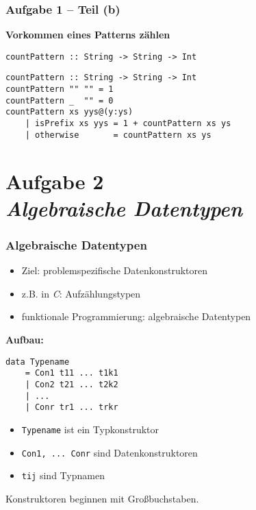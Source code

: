 \documentclass{beamer}
\begin{document}
\begin{frame}[t, fragile] \frametitle{Aufgabe 1 -- Teil (b)}
	\textbf{Vorkommen eines Patterns zählen}
	
	\texttt{countPattern :: String -> String -> Int}
	
	\pause\bigskip

	\begin{lstlisting}[style=bg]
countPattern :: String -> String -> Int
countPattern "" "" = 1
countPattern _  "" = 0
countPattern xs yys@(y:ys)
	| isPrefix xs yys = 1 + countPattern xs ys
	| otherwise       = countPattern xs ys
	\end{lstlisting}
\end{frame}


\section{Aufgabe 2 \\ \textit{\normalsize Algebraische Datentypen}}

\begin{frame}[fragile] \frametitle{Algebraische Datentypen}
	\footnotesize
	\begin{itemize}
		\item Ziel: problemspezifische Datenkonstruktoren
		\item z.B. in \textit{C}: Aufzählungstypen
		\item funktionale Programmierung: algebraische Datentypen
	\end{itemize}

	\textbf{Aufbau:}
	\begin{lstlisting}[style=bg]
data Typename 
	= Con1 t11 ... t1k1
	| Con2 t21 ... t2k2
	| ...
	| Conr tr1 ... trkr
	\end{lstlisting}
	\begin{itemize}
		\item \texttt{Typename} ist ein Typkonstruktor
		\item \texttt{Con1, ... Conr} sind Datenkonstruktoren
		\item \texttt{tij} sind Typnamen
	\end{itemize}
	Konstruktoren beginnen mit Großbuchstaben.
\end{frame}
\end{document}

